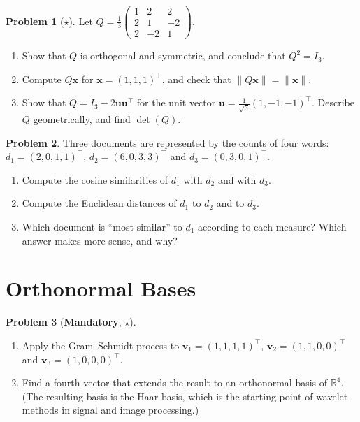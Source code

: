 \documentclass[11pt]{article}
\theoremstyle{definition}
\newtheorem{problem}{Problem}[section]
\newcommand{\mandatory}{\textcolor{red!70!black}{\textbf{Mandatory}}}
\newcommand{\norm}[1]{\lVert #1 \rVert}
\begin{document}
\begin{problem}[$\star$]\label{pr:householder-q}
    Let $Q = \frac{1}{3}\begin{pmatrix} 1 & 2 & 2 \\ 2 & 1 & -2 \\ 2 & -2 & 1 \end{pmatrix}$.
    \begin{enumerate}[label=(\alph*)]
        \item Show that $Q$ is orthogonal and symmetric, and conclude that $Q^2 = I_3$.
        \item Compute $Q\mathbf{x}$ for $\mathbf{x} = (1, 1, 1)^\top$, and check that $\norm{Q\mathbf{x}} = \norm{\mathbf{x}}$.
        \item Show that $Q = I_3 - 2\mathbf{u}\mathbf{u}^\top$ for the unit vector $\mathbf{u} = \frac{1}{\sqrt{3}}(1, -1, -1)^\top$. Describe $Q$ geometrically, and find $\det(Q)$.
    \end{enumerate}
\end{problem}

\begin{problem}\label{pr:cosine-docs}
    Three documents are represented by the counts of four words: $d_1 = (2, 0, 1, 1)^\top$, $d_2 = (6, 0, 3, 3)^\top$ and $d_3 = (0, 3, 0, 1)^\top$.
    \begin{enumerate}[label=(\alph*)]
        \item Compute the cosine similarities of $d_1$ with $d_2$ and with $d_3$.
        \item Compute the Euclidean distances of $d_1$ to $d_2$ and to $d_3$.
        \item Which document is ``most similar'' to $d_1$ according to each measure? Which answer makes more sense, and why?
    \end{enumerate}
\end{problem}

\section{Orthonormal Bases}

\begin{problem}[\mandatory, $\star$]\label{pr:gs-haar}
    \begin{enumerate}[label=(\alph*)]
        \item Apply the Gram--Schmidt process to $\mathbf{v}_1 = (1, 1, 1, 1)^\top$, $\mathbf{v}_2 = (1, 1, 0, 0)^\top$ and $\mathbf{v}_3 = (1, 0, 0, 0)^\top$.
        \item Find a fourth vector that extends the result to an orthonormal basis of $\mathbb{R}^4$. (The resulting basis is the Haar basis, which is the starting point of wavelet methods in signal and image processing.)
    \end{enumerate}
\end{problem}
\end{document}
